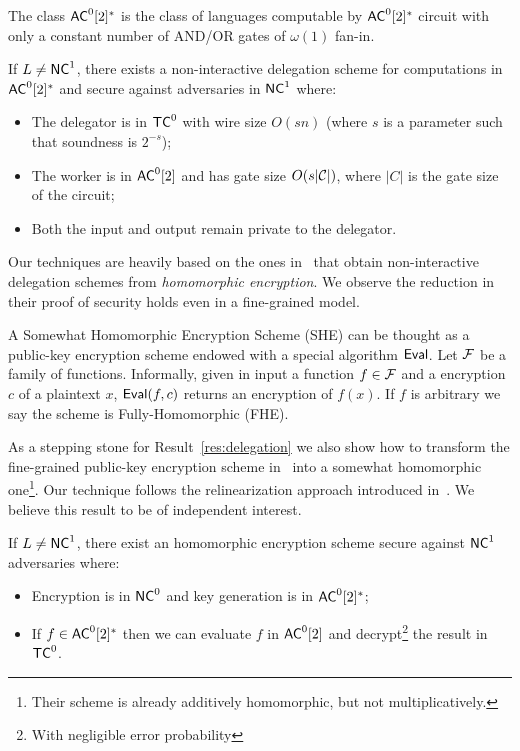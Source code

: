 \begin{definition}
The class ${\mathsf{AC}}^0[2]^*$ is the class of languages computable by ${\mathsf{AC}}^0[2]^*$ circuit with only a constant number of AND/OR gates of $\omega(1)$ fan-in.
\end{definition}

\begin{result}
	\label{res:delegation}
	If $L \not = {\mathsf{NC}}^1$, there exists a non-interactive delegation scheme for computations in ${\mathsf{AC}}^0[2]^*$ and secure against adversaries in ${\mathsf{NC}}^1$ where:
	\begin{itemize}
		\item The delegator is in ${\mathsf{TC}}^0$ with wire size $O(sn)$ (where $s$ is a parameter such that soundness  is $2^{-s}$);
		\item The worker is in ${\mathsf{AC}}^0[2]$ and has gate size $O(s|\cal{C}|)$, where $|C|$ is the gate size of the circuit;
		\item Both the input and output remain private to the delegator.
	\end{itemize} 
\end{result}

Our techniques are heavily based on the ones in~\cite{ckv10} that obtain non-interactive delegation schemes from \textit{homomorphic encryption}. We observe the reduction in their proof of security holds even in a fine-grained model.

A Somewhat Homomorphic Encryption Scheme (SHE) can be thought as a public-key encryption scheme endowed with a special algorithm $\mathsf{Eval}$. Let $\cal{F}$ be a family of functions. Informally, given in input a function $f \in \cal{F}$ and a encryption $c$ of a plaintext $x$, $\mathsf{Eval}(f, c)$ returns an encryption of $f(x)$. If $f$ is arbitrary we say the scheme is Fully-Homomorphic (FHE).

As a stepping stone  for Result~\ref{res:delegation} we  also show how to transform the fine-grained public-key encryption scheme in~\cite{fgcrypto} into a somewhat homomorphic one\footnote{Their scheme is already additively homomorphic, but not multiplicatively.}. Our technique follows the relinearization approach introduced in~\cite{fhe-lwe}. We believe this result to be of independent interest.

\begin{result}
	If $L \not = {\mathsf{NC}}^1$, there exist an homomorphic encryption scheme secure against ${\mathsf{NC}}^1$ adversaries where:
	\begin{itemize}
		\item Encryption is in ${\mathsf{NC}}^0$ and key generation is in ${\mathsf{AC}}^0[2]^*$;
		\item If $f \in {\ensuremath{\mathsf{AC}}}^0[2]^*$ then we can evaluate $f$ in ${\mathsf{AC}}^0[2]$ and decrypt\footnote{With negligible error probability} the result in ${\mathsf{TC}}^0$.
	\end{itemize}
\end{result}

